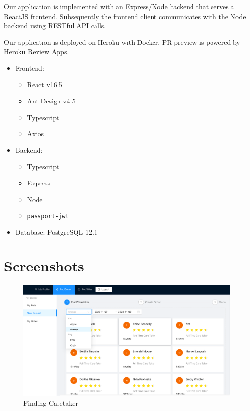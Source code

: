 \documentclass[
  paper=a4,
  ,captions=tableheading
]{scrartcl}
\newcommand{\passthrough}[1]{#1}
\providecommand{\tightlist}{%
  \setlength{\itemsep}{0pt}\setlength{\parskip}{0pt}}
\begin{document}
Our application is implemented with an Express/Node backend that serves
a ReactJS frontend. Subsequently the frontend client communicates with
the Node backend using RESTful API calls.

Our application is deployed on Heroku with Docker. PR preview is powered
by Heroku Review Apps.

\begin{itemize}
\tightlist
\item
  Frontend:

  \begin{itemize}
  \tightlist
  \item
    React v16.5
  \item
    Ant Design v4.5
  \item
    Typescript
  \item
    Axios
  \end{itemize}
\item
  Backend:

  \begin{itemize}
  \tightlist
  \item
    Typescript
  \item
    Express
  \item
    Node
  \item
    \passthrough{\lstinline!passport-jwt!}
  \end{itemize}
\item
  Database: PostgreSQL 12.1
\end{itemize}

\hypertarget{screenshots}{%
\section{Screenshots}\label{screenshots}}

\begin{figure}
\centering
\includegraphics{find-caretaker.png}
\caption{Finding Caretaker}
\end{figure}
\end{document}
